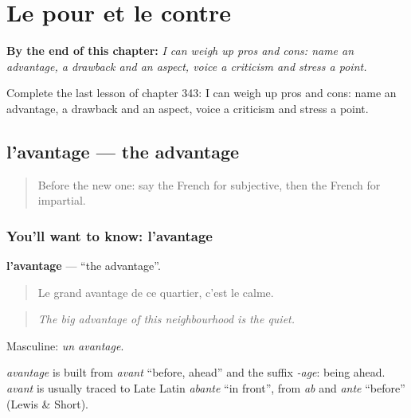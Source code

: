 
\chapter{Le pour et le contre}
\label{ch:fr-le-pour-et-le-contre}

\begin{chapteropening}
\textbf{By the end of this chapter:} \emph{I can weigh up pros and cons: name an advantage, a drawback and an aspect, voice a criticism and stress a point.}

Complete the last lesson of chapter 343: I can weigh up pros and cons: name an advantage, a drawback and an aspect, voice a criticism and stress a point.
\end{chapteropening}

\section[l'avantage]{l'avantage — the advantage}

\label{lesson:FR-C343-avantage}



\begin{quote}
Before the new one: say the French for subjective, then the French for impartial.
\end{quote}

\subsection*{You'll want to know: l'avantage}
\textbf{l'avantage} — \textquotedblleft{}the advantage\textquotedblright{}.

\begin{quote}
Le grand avantage de ce quartier, c'est le calme.
\end{quote}

\begin{quote}
\emph{The big advantage of this neighbourhood is the quiet.}
\end{quote}

Masculine: \emph{un avantage}.

\begin{cousinweb}
\emph{avantage} is built from \emph{avant} \textquotedblleft{}before, ahead\textquotedblright{} and the suffix \emph{-age}: being ahead. \emph{avant} is usually traced to Late Latin \emph{abante} \textquotedblleft{}in front\textquotedblright{}, from \emph{ab} and \emph{ante} \textquotedblleft{}before\textquotedblright{} (Lewis \& Short).
\end{cousinweb}

